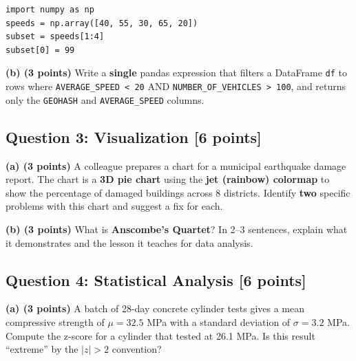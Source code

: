 \documentclass[11pt,a4paper]{article}
\begin{document}
\begin{lstlisting}
import numpy as np
speeds = np.array([40, 55, 30, 65, 20])
subset = speeds[1:4]
subset[0] = 99
\end{lstlisting}

\vspace{4.5cm}

\noindent\textbf{(b) (3 points)} Write a \textbf{single} pandas expression that filters a DataFrame \lstinline{df} to rows where \lstinline{AVERAGE_SPEED < 20} AND \lstinline{NUMBER_OF_VEHICLES > 100}, and returns only the \lstinline{GEOHASH} and \lstinline{AVERAGE_SPEED} columns.

\vspace{4.5cm}

\newpage
\subsection*{Question 3: Visualization \hfill [6 points]}

\noindent\textbf{(a) (3 points)} A colleague prepares a chart for a municipal earthquake damage report. The chart is a \textbf{3D pie chart} using the \textbf{jet (rainbow) colormap} to show the percentage of damaged buildings across 8 districts. Identify \textbf{two} specific problems with this chart and suggest a fix for each.

\vspace{5.5cm}

\noindent\textbf{(b) (3 points)} What is \textbf{Anscombe's Quartet}? In 2--3 sentences, explain what it demonstrates and the lesson it teaches for data analysis.

\vspace{5cm}

\subsection*{Question 4: Statistical Analysis \hfill [6 points]}

\noindent\textbf{(a) (3 points)} A batch of 28-day concrete cylinder tests gives a mean compressive strength of $\mu = 32.5$ MPa with a standard deviation of $\sigma = 3.2$ MPa. Compute the z-score for a cylinder that tested at 26.1 MPa. Is this result ``extreme'' by the $|z| > 2$ convention?

\vspace{4.5cm}
\end{document}
